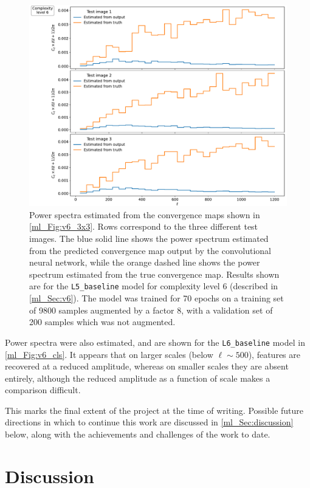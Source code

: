 \begin{figure}[tp]
\includegraphics[width=\textwidth]{v6_cls}
\caption{Power spectra estimated from the convergence maps shown in \autoref{ml_Fig:v6_3x3}. Rows correspond to the three different test images. The blue solid line shows the power spectrum estimated from the predicted convergence map output by the convolutional neural network, while the orange dashed line shows the power spectrum estimated from the true convergence map. Results shown are for the \texttt{L5\_baseline} model for complexity level 6 (described in \autoref{ml_Sec:v6}). The model was trained for 70 epochs on a training set of 9800 samples augmented by a factor 8, with a validation set of 200 samples which was not augmented.}
\label{ml_Fig:v6_cls}
\end{figure}

Power spectra were also estimated, and are shown for the \texttt{L6\_baseline} model in \autoref{ml_Fig:v6_cls}. It appears that on larger scales (below $\ell \sim 500$), features are recovered at a reduced amplitude, whereas on smaller scales they are absent entirely, although the reduced amplitude as a function of scale makes a comparison difficult.

This marks the final extent of the project at the time of writing. Possible future directions in which to continue this work are discussed in \autoref{ml_Sec:discussion} below, along with the achievements and challenges of the work to date.

\clearpage
\section{Discussion}
\label{ml_Sec:discussion}


